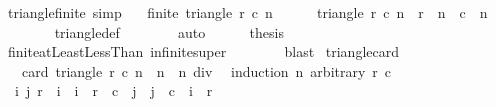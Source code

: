 \begin{isabellebody}
\isanewline
{}\isamarkupfalse%
\ triangle{\isacharunderscore}finite\ {\isacharbrackleft}simp{\isacharbrackright}{\isacharcolon}\isanewline
\ \ \ {\isachardoublequoteopen}finite\ {\isacharparenleft}triangle\ r{}\ c{}\ n{\isacharparenright}{\isachardoublequoteclose}\isanewline
%
\isadelimproof
%
\endisadelimproof
%
\isatagproof
{}\isamarkupfalse%
{\isacharminus}\isanewline
\ \ \ \ \isamarkupfalse%
\ {\isachardoublequoteopen}triangle\ r{}\ c{}\ n\ {\isasymsubseteq}\ {\isacharbraceleft}{}{\isachardot}{\isachardot}{\isacharless}r{}\ {\isacharplus}\ n{\isacharbraceright}\ {\isasymtimes}\ {\isacharbraceleft}{}{\isachardot}{\isachardot}{\isacharless}c{}\ {\isacharplus}\ n{\isacharbraceright}{\isachardoublequoteclose}\isanewline
\ \ \ \ \ \ \isamarkupfalse%
\ triangle{\isacharunderscore}def\isanewline
\ \ \ \ \ \ \isamarkupfalse%
\ auto\isanewline
\ \ \ \ \isamarkupfalse%
\ {\isacharquery}thesis\isanewline
\ \ \ \ \ \ \isamarkupfalse%
\ finite{\isacharunderscore}atLeastLessThan\ infinite{\isacharunderscore}super\isanewline
\ \ \ \ \ \ \isamarkupfalse%
\ blast\isanewline
{}\isamarkupfalse%
%
\endisatagproof
{\isafoldproof}%
%
\isadelimproof
\isanewline
%
\endisadelimproof
\isanewline
{}\isamarkupfalse%
\ triangle{\isacharunderscore}card{\isacharcolon}\isanewline
\ \ \ {\isachardoublequoteopen}card\ {\isacharparenleft}triangle\ r{}\ c{}\ n{\isacharparenright}\ {\isacharequal}\ n\ {\isacharasterisk}\ {\isacharparenleft}n{\isacharplus}{}{\isacharparenright}\ div\ {}{\isachardoublequoteclose}\isanewline
%
\isadelimproof
%
\endisadelimproof
%
\isatagproof
{}\isamarkupfalse%
\ {\isacharparenleft}induction\ n\ arbitrary{\isacharcolon}\ r{}\ c{}{\isacharparenright}\isanewline
\ \ \isamarkupfalse%
\ {}\isanewline
\ \ \isamarkupfalse%
\ {\isacharasterisk}{\isacharcolon}\ {\isachardoublequoteopen}{\isacharbraceleft}{\isacharparenleft}i{\isacharcomma}\ j{\isacharparenright}{\isachardot}\ r{}\ {\isasymle}\ i\ {\isasymand}\ i\ {\isacharless}\ r{}\ {\isasymand}\ c{}\ {\isasymle}\ j\ {\isasymand}\ j\ {\isasymle}\ c{}\ {\isacharplus}\ i\ {\isacharminus}\ r{}{\isacharbraceright}\ {\isacharequal}\ {\isacharbraceleft}{\isacharbraceright}{\isachardoublequoteclose}\isanewline

\end{isabellebody}
